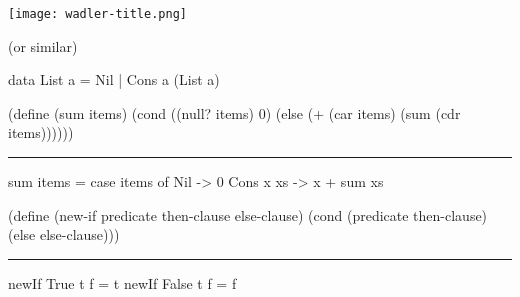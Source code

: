 \begin{frame}
\centering
\texttt{[image: wadler-title.png]}
\end{frame}



\begin{frame}
\centering
\haskelllogo[scale=1.5]

\nl
(or similar)
\end{frame}


\iffalse
\begin{frame}[fragile]
\begin{haskellcode}
perimeter shape =
  case shape of
    Square s      -> s * 4
    Rectangle w h -> 2*w + 2*h
    Circle r      -> 2 * pi * r
\end{haskellcode}
\end{frame}
\fi

\begin{frame}[fragile]
\begin{haskellcode}
data List a
  = Nil
  | Cons a (List a)
\end{haskellcode}
\end{frame}


\begin{frame}[fragile]
\begin{schemecode}
(define (sum items)
  (cond ((null? items) 0)
        (else (+ (car items) (sum (cdr items))))))
\end{schemecode}

\nl
\hrule
\pnl

\begin{haskellcode}
sum items = case items of
  Nil       -> 0
  Cons x xs -> x + sum xs
\end{haskellcode}
\end{frame}


\begin{frame}[fragile]

\begin{schemecode}
(define (new-if predicate then-clause else-clause)
  (cond (predicate then-clause)
        (else else-clause)))
\end{schemecode}

\nl
\hrule
\pnl

\begin{haskellcode}
newIf True  t f = t
newIf False t f = f
\end{haskellcode}
\end{frame}


